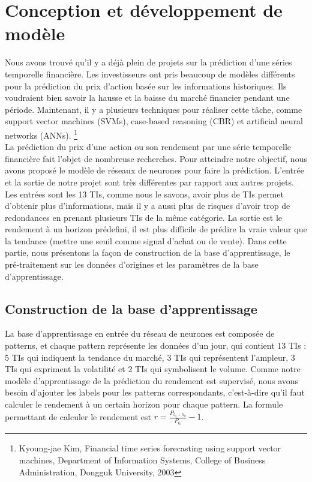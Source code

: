 

\section{Conception et développement de modèle}

Nous avons trouvé qu’il y a déjà plein de projets sur la prédiction d’une séries temporelle financière. Les investisseurs ont pris beaucoup de modèles différents pour la prédiction du prix d'action basée sur les informations historiques. Ils voudraient bien savoir la hausse et la baisse du marché financier pendant une période. Maintenant, il y a plusieurs techniques pour réaliser cette tâche, comme support vector machines (SVMs), case-based reasoning (CBR) et artificial neural networks (ANNs). \footnote{Kyoung-jae Kim, Financial time series forecasting using support vector machines, Department of Information Systems, College of Business Administration, Dongguk University, 2003} \\

La prédiction du prix d'une action ou son rendement par une série temporelle financière fait l'objet de nombreuse recherches. Pour atteindre notre objectif, nous avons proposé le modèle de réseaux de neurones pour faire la prédiction. L’entrée et la sortie de notre projet sont très différentes par rapport aux autres projets. Les entrées sont les 13 TIs, comme nous le savons, avoir plus de TIs permet d'obtenir plus d’informations, mais il y a aussi plus de risques d’avoir trop de redondances en prenant plusieurs TIs de la même catégorie. La sortie est le rendement à un horizon prédefini, il est plus difficile de prédire la vraie valeur que la tendance (mettre une seuil comme signal d’achat ou de vente). Dans cette partie, nous présentons la façon de construction de la base d'apprentissage, le pré-traitement sur les données d'origines et les paramètres de la base d'apprentissage. 

\subsection{Construction de la base d’apprentissage}

La base d'apprentissage en entrée du réseau de neurones est composée de patterns, et chaque pattern représente les données d'un jour, qui contient 13 TIs : 5 TIs qui indiquent la tendance du marché, 3 TIs qui représentent l'ampleur, 3 TIs qui expriment la volatilité et 2 TIs qui symbolisent le volume. Comme notre modèle d'apprentissage de la prédiction du rendement est supervisé, nous avons besoin d’ajouter les labels pour les patterns correspondants, c’est-à-dire qu'il faut calculer le rendement à un certain horizon pour chaque pattern. La formule permettant de calculer le rendement est $ r = \frac{P_{t_{0}+h_{0}}}{P_{t_{0}}} - 1 $.


